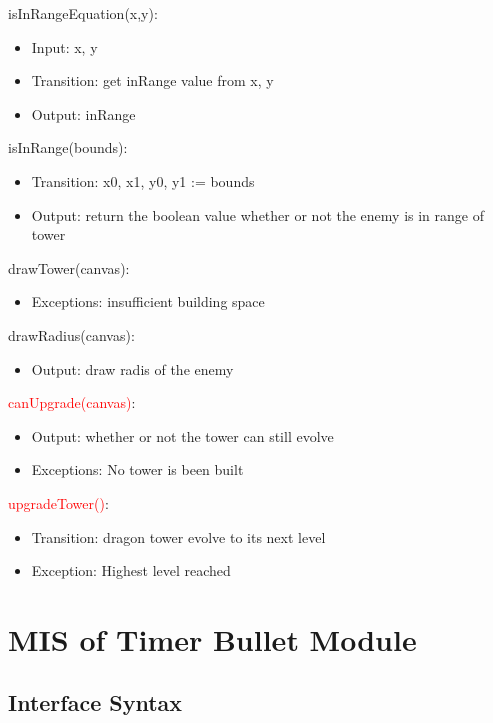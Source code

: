 \documentclass[12,english]{article}
\begin{document}
\noindent isInRangeEquation(x,y):
\begin{itemize}
    \item Input: x, y
    \item Transition: get inRange value from x, y
    \item Output: inRange
\end{itemize}

\noindent isInRange(bounds):
\begin{itemize}
    \item Transition: x0, x1, y0, y1 := bounds
    \item Output: return the boolean value whether or not the enemy is in range of tower
\end{itemize}

\noindent drawTower(canvas):
\begin{itemize}
    \item Exceptions: insufficient building space
\end{itemize}

\noindent drawRadius(canvas):
\begin{itemize}
    \item Output: draw radis of the enemy
\end{itemize}

\noindent \textcolor{red}{canUpgrade(canvas)}:
\begin{itemize}
    \item Output:  whether or not the tower can still evolve
    \item Exceptions: No tower is been built
\end{itemize}

\noindent \textcolor{red}{upgradeTower()}:
\begin{itemize}
    \item Transition: dragon tower evolve to its next level
    \item Exception:  Highest level reached
\end{itemize}

\section{MIS of Timer Bullet Module}
\subsection{Interface Syntax}
\end{document}
